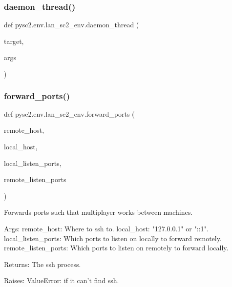 \subsubsection{\texorpdfstring{daemon\+\_\+thread()}{daemon\_thread()}}
{\footnotesize\ttfamily def pysc2.\+env.\+lan\+\_\+sc2\+\_\+env.\+daemon\+\_\+thread (\begin{DoxyParamCaption}\item[{}]{target,  }\item[{}]{args }\end{DoxyParamCaption})}

\mbox{\label{namespacepysc2_1_1env_1_1lan__sc2__env_a8382bec2e77ada186d50420c6b6e2c49}} 
\subsubsection{\texorpdfstring{forward\+\_\+ports()}{forward\_ports()}}
{\footnotesize\ttfamily def pysc2.\+env.\+lan\+\_\+sc2\+\_\+env.\+forward\+\_\+ports (\begin{DoxyParamCaption}\item[{}]{remote\+\_\+host,  }\item[{}]{local\+\_\+host,  }\item[{}]{local\+\_\+listen\+\_\+ports,  }\item[{}]{remote\+\_\+listen\+\_\+ports }\end{DoxyParamCaption})}

\begin{DoxyVerb}Forwards ports such that multiplayer works between machines.

Args:
  remote_host: Where to ssh to.
  local_host: "127.0.0.1" or "::1".
  local_listen_ports: Which ports to listen on locally to forward remotely.
  remote_listen_ports: Which ports to listen on remotely to forward locally.

Returns:
  The ssh process.

Raises:
  ValueError: if it can't find ssh.
\end{DoxyVerb}
 \mbox{\label{namespacepysc2_1_1env_1_1lan__sc2__env_ac87a5369e364472d49c7d9cf29d61712}} 
